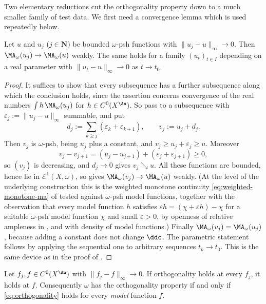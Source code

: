 Two elementary reductions cut the orthogonality property down to a much
smaller family of test data.  We first need a convergence lemma which is
used repeatedly below.

\begin{lemma}
\label{lem:ch27-uniform-ma}
Let \(u\) and \(u_j\) (\(j\in\mathbf N\)) be bounded \(\omega\)-psh
functions with \(\lVert u_j-u\rVert_\infty\to0\).  Then
\(\MA_\omega(u_j)\to\MA_\omega(u)\) weakly.  The same holds for a family
\((u_t)_{t\in I}\) depending on a real parameter with
\(\lVert u_t-u\rVert_\infty\to0\) as \(t\to t_0\).
\end{lemma}

\begin{proof}
It suffices to show that every subsequence has a further subsequence along
which the conclusion holds, since the assertion concerns convergence of the
real numbers \(\int h\,\MA_\omega(u_j)\) for \(h\in C^0(X^{\An})\).  So pass
to a subsequence with \(\varepsilon_j:=\lVert u_j-u\rVert_\infty\)
summable, and put
\[
 d_j:=\sum_{k\geq j}(\varepsilon_k+\varepsilon_{k+1}),
 \qquad v_j:=u_j+d_j .
\]
Then \(v_j\) is \(\omega\)-psh, being \(u_j\) plus a constant, and
\(v_j\geq u_j+\varepsilon_j\geq u\).  Moreover
\[
 v_j-v_{j+1}=(u_j-u_{j+1})+(\varepsilon_j+\varepsilon_{j+1})\geq0,
\]
so \((v_j)\) is decreasing, and \(d_j\to0\) gives \(v_j\searrow u\).  All
these functions are bounded, hence lie in \(\mathcal E^1(X,\omega)\), so
 gives
\(\MA_\omega(v_j)\to\MA_\omega(u)\) weakly.  (At the level of the underlying
construction this is the weighted monotone continuity
\eqref{eq:weighted-monotone-ma} of  tested
against \(\omega\)-psh model functions, together with the observation that
every model function \(h\) satisfies \(\varepsilon h=(\chi+\varepsilon
h)-\chi\) for a suitable \(\omega\)-psh model function \(\chi\) and small
\(\varepsilon>0\), by openness of relative ampleness in
, and with density of model
functions.)  Finally
\(\MA_\omega(v_j)=\MA_\omega(u_j)\), because adding a constant does not
change \(\ddc\).  The parametric statement follows by applying the
sequential one to arbitrary sequences \(t_k\to t_0\).  This is the same
device as in the proof of .
\end{proof}

\begin{proposition}
\label{prop:ch27-orthogonality-uniform-limits}
Let \(f_j,f\in C^0(X^{\An})\) with \(\lVert f_j-f\rVert_\infty\to0\).  If
orthogonality holds at every \(f_j\), it holds at \(f\).  Consequently
\(\omega\) has the orthogonality property if and only if
\eqref{eq:orthogonality} holds for every \emph{model} function \(f\).
\end{proposition}

